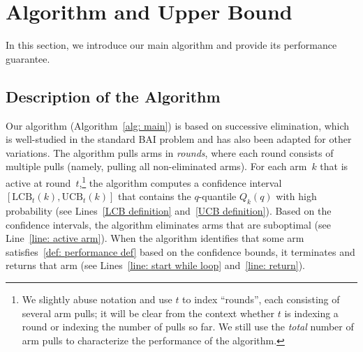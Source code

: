 \section{Algorithm and Upper Bound}


In this section, we introduce our main algorithm and provide its performance guarantee. 

\subsection{Description of the Algorithm}
Our algorithm (Algorithm~\ref{alg: main}) is based on successive elimination, which is well-studied in the standard BAI problem and has also been adapted for other variations.  The algorithm pulls arms in \emph{rounds}, where each round consists of multiple pulls (namely, pulling all non-eliminated arms).  
For each arm~$k$ that is active at round~$t$,\footnote{We slightly abuse notation and use $t$ to index ``rounds'', each consisting of several arm pulls; it will be clear from the context whether $t$ is indexing a round or indexing the number of pulls so far.  We still use the \emph{total} number of arm pulls to characterize the performance of the algorithm.} the algorithm computes a confidence interval 
$\left[ \mathrm{LCB}_t(k), \mathrm{UCB}_t(k)\right]$ that
contains the $q$-quantile $Q_k(q)$ with high probability (see Lines~\ref{LCB definition} and~\ref{UCB definition}). Based on the confidence intervals, the algorithm eliminates arms that are suboptimal (see Line~\ref{line: active arm}). When the algorithm identifies that some arm satisfies~\eqref{def: performance def} based on the confidence bounds, it terminates and returns that arm (see Lines~\ref{line: start while loop} and~\ref{line: return}).

